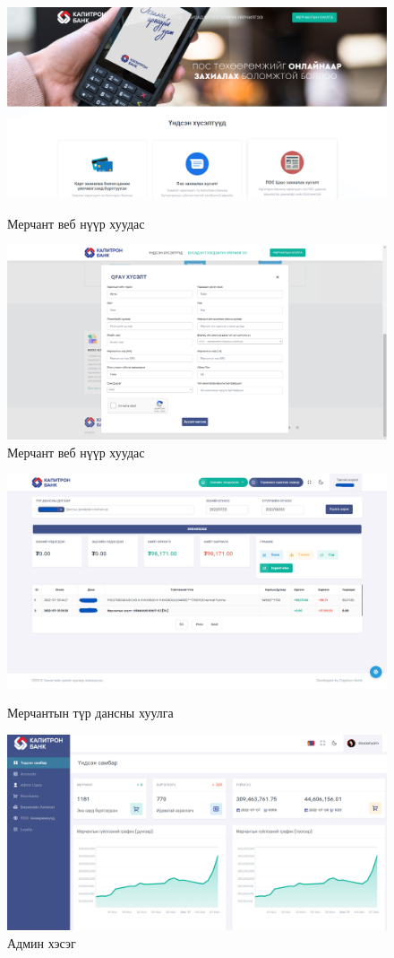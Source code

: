 \begin{figure}[h]
    \centering
    \includegraphics[width=14cm]{images/merchant.png}
    \caption{Мерчант веб нүүр хуудас}
    \label{fig:form}

    \centering
    \includegraphics[width=14cm]{images/request.png}
    \caption{Мерчант веб нүүр хуудас}
    \label{fig:form}
\end{figure}

\begin{figure}
    \centering
    \includegraphics[width=15cm]{images/merchant1.png}
    \caption{Мерчантын түр дансны хуулга}
    \label{fig:form}
    
    \centering
    \includegraphics[width=15cm]{images/admin.png}
    \caption{Админ хэсэг}
    \label{fig:form}
\end{figure}

